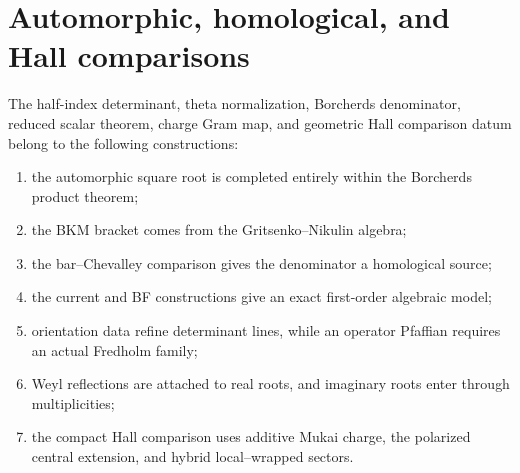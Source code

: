 \chapter{Automorphic, homological, and Hall comparisons}
The half-index determinant, theta normalization, Borcherds denominator, reduced scalar theorem, charge Gram map, and geometric Hall comparison datum belong to the following constructions:
\begin{enumerate}
\item the automorphic square root is completed entirely within the Borcherds product theorem;
\item the BKM bracket comes from the Gritsenko--Nikulin algebra;
\item the bar--Chevalley comparison gives the denominator a homological source;
\item the current and BF constructions give an exact first-order algebraic model;
\item orientation data refine determinant lines, while an operator Pfaffian requires an actual Fredholm family;
\item Weyl reflections are attached to real roots, and imaginary roots enter through multiplicities;
\item the compact Hall comparison uses additive Mukai charge, the polarized central extension, and hybrid local--wrapped sectors.
\end{enumerate}

